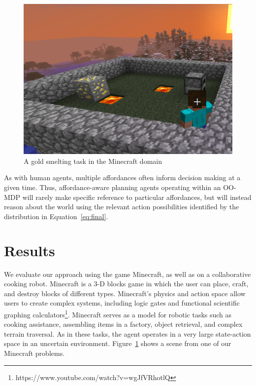 \documentclass[letterpaper]{article}
\begin{document}
\begin{figure}
\centering
\includegraphics[scale=0.11]{figures/smelting.png}%
  \caption{A gold smelting task in the Minecraft domain}
  \label{fig:minecraft}
\end{figure}

As with human agents, multiple affordances often inform decision making at a given time.
Thus, affordance-aware planning agents operating within an OO-MDP will rarely make specific
reference to particular affordances, but will instead reason about the world using the relevant
action possibilities identified by the distribution in Equation~\ref{eq:final}.

\section{Results}
\label{sec:results}

We evaluate our approach using the game Minecraft, as well as on a
collaborative cooking robot.  Minecraft is a 3-D blocks game in which
the user can place, craft, and destroy blocks of different types.
Minecraft's physics and action space allow users to create complex
systems, including logic gates and functional scientific graphing
calculators\footnote{https://www.youtube.com/watch?v=wgJfVRhotlQ}.
Minecraft serves as a model for robotic tasks such as cooking
assistance, assembling items in a factory, object retrieval, and
complex terrain traversal.  As in these tasks, the agent operates in a
very large state-action space in an uncertain environment.
Figure~\ref{fig:minecraft} shows a scene from one of our Minecraft
problems.
\end{document}

